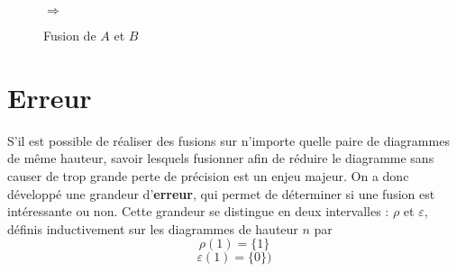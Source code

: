 \begin{multicols}{2}
  \columnbreak
  \begin{figure}[H]
    \centering
  $\Rightarrow$
  \caption{Fusion de $A$ et $B$}
  \label{fig:exemple_fusion}
  \end{figure}

  \end{multicols}

\section{Erreur}

S'il est possible de réaliser des fusions sur n'importe quelle paire de diagrammes de même hauteur, savoir lesquels fusionner afin de réduire le diagramme sans causer de trop grande perte de précision est un enjeu majeur. On a donc développé une grandeur d'\textbf{erreur}, qui permet de déterminer si une fusion est intéressante ou non. Cette grandeur se distingue en deux intervalles : $\rho$ et $\varepsilon$, définis inductivement sur les diagrammes de hauteur $n$ par
$$\rho(\boxed{1}) = \{1\}$$
$$\varepsilon(\boxed{1}) = \{0\})$$


